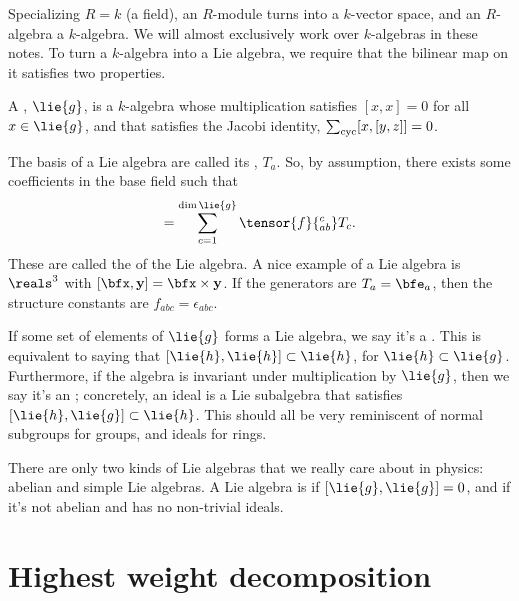\documentclass[11pt]{article}
\begin{document}
Specializing $R = k$ (a field), an $R$-module turns into a $k$-vector space,
and an $R$-algebra a $k$-algebra. We will almost exclusively work over $k$-algebras
in these notes. To turn a $k$-algebra into a Lie algebra, we require that the bilinear
map on it satisfies two properties.

\begin{definition}
    A , $\lie{g}$, is a $k$-algebra whose multiplication
    satisfies $[x, x] = 0$ for all $x \in \lie{g}$, and that satisfies
    the Jacobi identity, $\sum_{\rm cyc} [x, [y, z]] = 0$.
\end{definition}

The basis of a Lie algebra are called its , $T_a$.
So, by assumption, there exists some coefficients in the base field such
that
\begin{align*}
    [T_a, T_b] = \sum_{c = 1}^{\dim{\lie{g}}} \tensor{f}{_{ab}^c} T_c.
\end{align*}
These are called the  of the Lie algebra. 
A nice example of a Lie algebra is $\reals^3$ with 
$[\bfx, \mathbf{y}] = \bfx \times \mathbf{y}$.
If the generators are $T_a = \bfe_a$, then the structure constants
are $f_{abc} = \epsilon_{abc}$.

If some set of elements of $\lie{g}$ forms a Lie algebra, we say
it's a . This is equivalent to saying that $[\lie{h}, \lie{h}] \subset \lie{h}$,
for $\lie{h} \subset \lie{g}$. Furthermore, if the algebra is invariant
under multiplication by $\lie{g}$, then we say it's an ;
concretely, an ideal is a Lie subalgebra that satisfies $[\lie{h}, \lie{g}] \subset \lie{h}$.
This should all be very reminiscent of normal subgroups for groups,
and ideals for rings.

There are only two kinds of Lie algebras that we really care about in
physics: abelian and simple Lie algebras. A Lie algebra is 
if $[\lie{g}, \lie{g}] = 0$, and  if it's not abelian and has
no non-trivial ideals.


\section{Highest weight decomposition}
\end{document}
